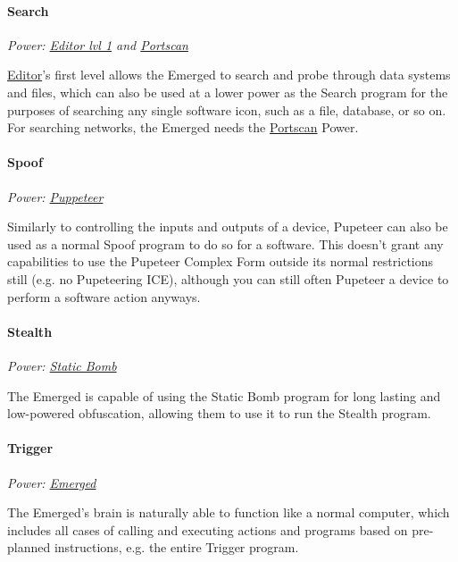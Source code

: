\begin{multicols*}{3}
	\paragraph{Search}
	\begin{center}
		\textit{Power: \hyperref[editor]{Editor lvl 1} and \hyperref[portscan]{Portscan}}
	\end{center}

	\hyperref[editor]{Editor}'s first level allows the Emerged to search and probe through data systems and files, which can also be used at a lower power as the Search program for the purposes of searching any single software icon, such as a file, database, or so on. For searching networks, the Emerged needs the \hyperref[portscan]{Portscan} Power.
	
	\paragraph{Spoof}
	\begin{center}
		\textit{Power: \hyperref[puppeteer]{Puppeteer}}
	\end{center}

	Similarly to controlling the inputs and outputs of a device, Pupeteer can also be used as a normal Spoof program to do so for a software. This doesn't grant any capabilities to use the Pupeteer Complex Form outside its normal restrictions still (e.g. no Pupeteering ICE), although you can still often Pupeteer a device to perform a software action anyways.

	\paragraph{Stealth}
	\begin{center}
	\textit{Power: \hyperref[static_bomb]{Static Bomb}}
	\end{center}
	
	The Emerged is capable of using the Static Bomb program for long lasting and low-powered obfuscation, allowing them to use it to run the Stealth program.
	
	\paragraph{Trigger}
	\begin{center}
	\textit{Power: \hyperref[emerged]{Emerged}}
	\end{center}

	The Emerged's brain is naturally able to function like a normal computer, which includes all cases of calling and executing actions and programs based on pre-planned instructions, e.g. the entire Trigger program.


\end{multicols*}

